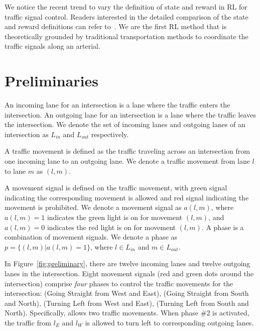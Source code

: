 We notice the recent trend to vary the definition of state and reward in RL for traffic signal control. Readers interested in the detailed comparison of the state and reward definitions can refer to~\cite{hua19survey}. We are the first RL method that is theoretically grounded by traditional transportation methods to coordinate the traffic signals along an arterial.


\section{Preliminaries}
\label{sec:preliminary}

\begin{definition}
An incoming lane for an intersection is a lane where the traffic enters the intersection. 
An outgoing lane for an intersection is a lane where the traffic leaves the intersection. 
We denote the set of incoming lanes and outgoing lanes of an intersection as $L_{in}$ and $L_{out}$ respectively.
\end{definition}
\vspace{-3mm}
\begin{definition}
A traffic movement is defined as the traffic traveling across an intersection from one incoming lane to an outgoing lane. We denote a traffic movement from lane $l$ to lane $m$ as $(l,m)$. 
\end{definition}
\vspace{-3mm}
\begin{definition}
A movement signal is defined on the traffic movement, with green signal indicating the corresponding movement is allowed and red signal indicating the movement is prohibited. We denote a movement signal as $a(l,m)$, where $a(l,m)=1$ indicates the green light is on for movement $(l,m)$, and $a(l,m)=0$ indicates the red light is on for movement $(l,m)$.
A phase is a combination of movement signals. We denote a phase as $p=\{(l,m)| a(l,m)=1\}$, where $l\in L_{in}$ and $m\in L_{out}$.
\end{definition}
In Figure~\ref{fig:preliminary}, there are twelve incoming lanes and twelve outgoing lanes in the intersection. Eight movement signals (red and green dots around the intersection) comprise \emph{four} phases to control the traffic movements for the intersection: \WEs (Going Straight from West and East), \SNs (Going Straight from South and North), \WEl (Turning Left from West and East), \SNl (Turning Left from South and North).  Specifically, \WEl allows two traffic movements. When phase \#2 is activated, the traffic from $l_E$ and $l_W$ is allowed to turn left to corresponding outgoing lanes.

